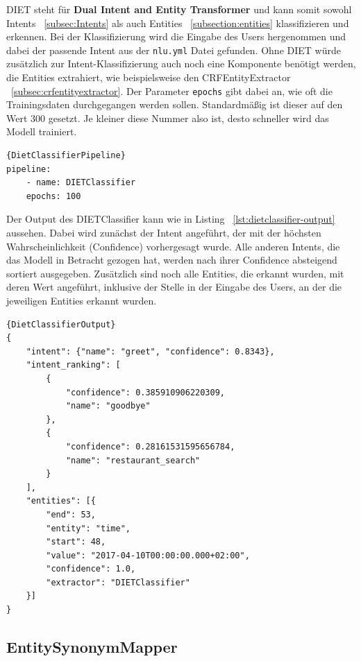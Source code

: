 DIET steht für \textbf{Dual Intent and Entity Transformer} und kann somit sowohl Intents ~\ref{subsec:Intents} als auch Entities ~\ref{subsection:entities} klassifizieren und erkennen.
Bei der Klassifizierung wird die Eingabe des Users hergenommen und dabei der passende Intent aus der \texttt{nlu.yml} Datei gefunden.
Ohne DIET würde zusätzlich zur Intent-Klassifizierung auch noch eine Komponente benötigt werden, die Entities extrahiert, wie beispielsweise den CRFEntityExtractor ~\ref{subsec:crfentityextractor}.
Der Parameter \texttt{epochs} gibt dabei an, wie oft die Trainingsdaten durchgegangen werden sollen.
Standardmäßig ist dieser auf den Wert 300 gesetzt.
Je kleiner diese Nummer also ist, desto schneller wird das Modell trainiert.\cite{dietClassifier}

\begin{lstlisting}[label={lst:dietclassifier-pipeline},caption={DietClassifier in Pipeline}]{DietClassifierPipeline}
pipeline:
    - name: DIETClassifier
    epochs: 100
\end{lstlisting}

Der Output des DIETClassifier kann wie in Listing ~\ref{lst:dietclassifier-output} aussehen.
Dabei wird zunächst der Intent angeführt, der mit der höchsten Wahrscheinlichkeit (Confidence) vorhergesagt wurde.
Alle anderen Intents, die das Modell in Betracht gezogen hat, werden nach ihrer Confidence absteigend sortiert ausgegeben.
Zusätzlich sind noch alle Entities, die erkannt wurden, mit deren Wert angeführt, inklusive der Stelle in der Eingabe des Users, an der die jeweiligen Entities erkannt wurden.

\begin{lstlisting}[label={lst:dietclassifier-output},caption={Output des DIETClassifiers ~\cite{dietClassifier}}]{DietClassifierOutput}
{
    "intent": {"name": "greet", "confidence": 0.8343},
    "intent_ranking": [
        {
            "confidence": 0.385910906220309,
            "name": "goodbye"
        },
        {
            "confidence": 0.28161531595656784,
            "name": "restaurant_search"
        }
    ],
    "entities": [{
        "end": 53,
        "entity": "time",
        "start": 48,
        "value": "2017-04-10T00:00:00.000+02:00",
        "confidence": 1.0,
        "extractor": "DIETClassifier"
    }]
}
\end{lstlisting}

\subsection{EntitySynonymMapper}\label{subsec:entitysynonymmapper}

